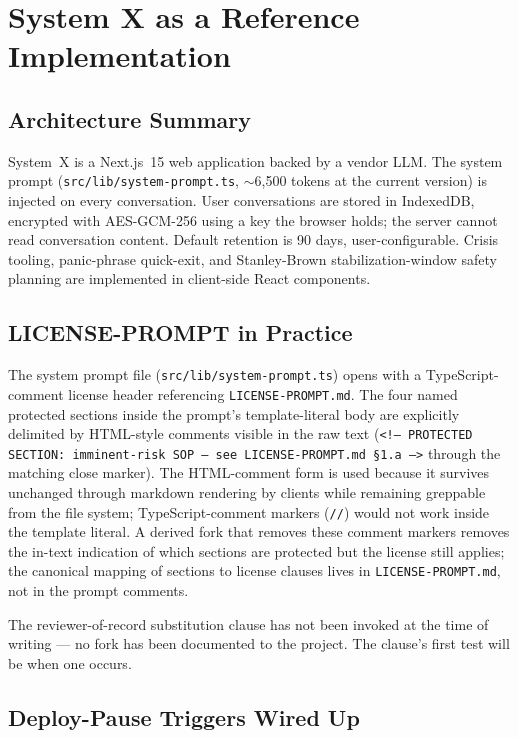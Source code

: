 \documentclass[letterpaper]{article} %
\begin{document}
\section{System X as a Reference Implementation}
\label{sec:systemx}

\subsection{Architecture Summary}

System~X is a Next.js~15 web application backed by a vendor LLM. The system prompt (\texttt{src/lib/system-prompt.ts}, $\sim$6,500 tokens at the current version) is injected on every conversation. User conversations are stored in IndexedDB, encrypted with AES-GCM-256 using a key the browser holds; the server cannot read conversation content. Default retention is 90 days, user-configurable. Crisis tooling, panic-phrase quick-exit, and Stanley-Brown stabilization-window safety planning \citep{brown2018spi} are implemented in client-side React components.

\subsection{LICENSE-PROMPT in Practice}

The system prompt file (\texttt{src/lib/system-prompt.ts}) opens with a TypeScript-comment license header referencing \texttt{LICENSE-PROMPT.md}. The four named protected sections inside the prompt's template-literal body are explicitly delimited by HTML-style comments visible in the raw text (\texttt{<!-- PROTECTED SECTION: imminent-risk SOP -- see LICENSE-PROMPT.md \S1.a -->} through the matching close marker). The HTML-comment form is used because it survives unchanged through markdown rendering by clients while remaining greppable from the file system; TypeScript-comment markers (\texttt{//}) would not work inside the template literal. A derived fork that removes these comment markers removes the in-text indication of which sections are protected but the license still applies; the canonical mapping of sections to license clauses lives in \texttt{LICENSE-PROMPT.md}, not in the prompt comments.

The reviewer-of-record substitution clause has not been invoked at the time of writing --- no fork has been documented to the project. The clause's first test will be when one occurs.

\subsection{Deploy-Pause Triggers Wired Up}
\end{document}

